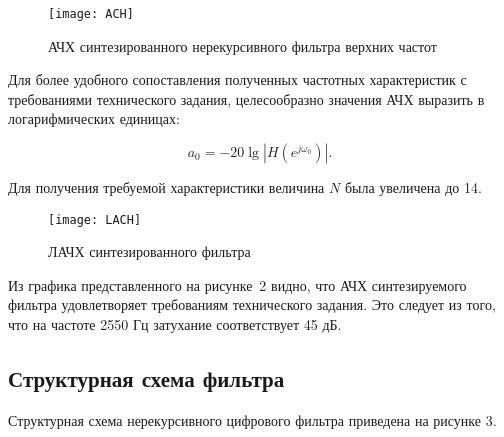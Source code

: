 \begin{figure}[h!]
  \label{f:1}
  \texttt{[image: ACH]}
  \caption{АЧХ синтезированного нерекурсивного фильтра верхних частот}
\end{figure}

Для более удобного сопоставления полученных частотных характеристик с
требованиями технического задания, целесообразно значения АЧХ выразить
в логарифмических единицах:

\begin{equation*}
  a_0 = -20 \lg\left|H(e^{j \omega_0})\right|.
\end{equation*}

Для получения требуемой характеристики величина $N$ была увеличена до 14.

\begin{figure}[h!]
  \label{f:2}
  \texttt{[image: LACH]}
  \caption{ЛАЧХ синтезированного фильтра}
\end{figure}


Из графика представленного на рисунке~2 видно, что АЧХ синтезируемого
фильтра удовлетворяет требованиям технического задания. Это следует из
того, что на частоте 2550 Гц затухание соответствует 45 дБ.

\subsection{Структурная схема фильтра}

Структурная схема нерекурсивного цифрового фильтра приведена на 
рисунке 3.


\newpage



